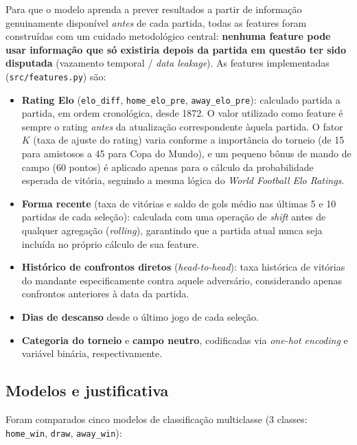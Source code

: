 \documentclass[12pt,a4paper]{article}
\begin{document}
Para que o modelo aprenda a prever resultados a partir de informação genuinamente disponível \emph{antes} de cada partida, todas as features foram construídas com um cuidado metodológico central: \textbf{nenhuma feature pode usar informação que só existiria depois da partida em questão ter sido disputada} (vazamento temporal / \emph{data leakage}). As features implementadas (\texttt{src/features.py}) são:

\begin{itemize}
    \item \textbf{Rating Elo} (\texttt{elo\_diff}, \texttt{home\_elo\_pre}, \texttt{away\_elo\_pre}): calculado partida a partida, em ordem cronológica, desde 1872. O valor utilizado como feature é sempre o rating \emph{antes} da atualização correspondente àquela partida. O fator $K$ (taxa de ajuste do rating) varia conforme a importância do torneio (de 15 para amistosos a 45 para Copa do Mundo), e um pequeno bônus de mando de campo (60 pontos) é aplicado apenas para o cálculo da probabilidade esperada de vitória, seguindo a mesma lógica do \emph{World Football Elo Ratings}.
    \item \textbf{Forma recente} (taxa de vitórias e saldo de gols médio nas últimas 5 e 10 partidas de cada seleção): calculada com uma operação de \emph{shift} antes de qualquer agregação (\emph{rolling}), garantindo que a partida atual nunca seja incluída no próprio cálculo de sua feature.
    \item \textbf{Histórico de confrontos diretos} (\emph{head-to-head}): taxa histórica de vitórias do mandante especificamente contra aquele adversário, considerando apenas confrontos anteriores à data da partida.
    \item \textbf{Dias de descanso} desde o último jogo de cada seleção.
    \item \textbf{Categoria do torneio} e \textbf{campo neutro}, codificadas via \emph{one-hot encoding} e variável binária, respectivamente.
\end{itemize}

\subsection{Modelos e justificativa}

Foram comparados cinco modelos de classificação multiclasse (3 classes: \texttt{home\_win}, \texttt{draw}, \texttt{away\_win}):
\end{document}

